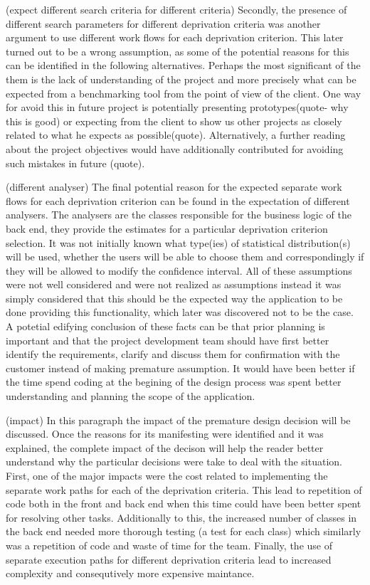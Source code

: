 \documentclass{l3proj}
\begin{document}
(expect different search criteria for different criteria)
Secondly, the presence of different search parameters for different deprivation criteria was another argument to use different work flows for each deprivation criterion. This later turned out to be a wrong assumption, as some of the potential reasons for this can be identified in the following alternatives. Perhaps the most significant of the them is the lack of understanding of the project and more precisely what can be expected from a benchmarking tool from the point of view of the client. One way for avoid this in future project is potentially presenting prototypes(quote- why this is good) or expecting from the client to show us other projects as closely related to what he expects as possible(quote). Alternatively, a further reading about the project objectives would have additionally contributed for avoiding such mistakes in future (quote).

(different analyser)
The final potential reason for the expected separate work flows for each deprivation criterion can be found in the expectation of different analysers. The analysers are the classes responsible for the business logic of the back end, they provide the estimates for a particular deprivation criterion selection. It was not initially known what type(ies) of statistical distribution(s) will be used, whether the users will be able to choose them and correspondingly if they will be allowed to modify the confidence interval.  All of these assumptions were not well considered and were not realized as assumptions instead it was simply considered that this should be the expected way the application to be done providing this functionality, which later was discovered not to be the case. A potetial edifying conclusion of these facts can be that prior planning is important and that the project development team should have first better identify the requirements, clarify and discuss them for confirmation with the customer instead of making premature assumption. It would have been better if the time spend coding at the begining of the design process was spent better understanding and planning the scope of the application.

(impact)
In this paragraph the impact of the premature design decision will be discussed. Once the reasons for its manifesting were identified and it was explained, the complete impact of the decison will help the reader better understand why the particular decisions were take to deal with the situation. First, one of the major impacts were the cost related to implementing the separate work paths for each of the deprivation criteria. This lead to repetition of code both in the front and back end when this time could have been better spent for resolving other tasks. Additionally to this, the increased number of classes in the back end needed more thorough testing (a test for each class) which similarly was a repetition of code and waste of time for the team. Finally, the use of separate execution paths for different deprivation criteria lead to increased complexity and consequtively more expensive maintance.
\end{document}
